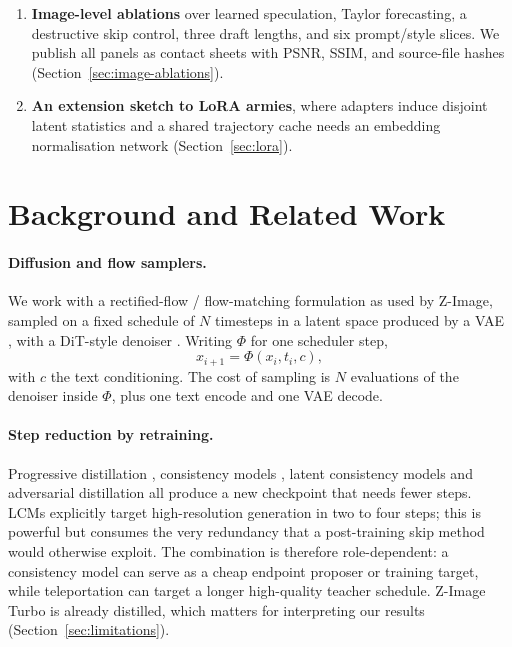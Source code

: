 \documentclass[11pt,a4paper]{article}
\begin{document}
\begin{enumerate}
    We distinguish pixel-exact serving results from approximate image retention and isolated kernel timing
    (Section~\ref{sec:native-ablation}).
  \item \textbf{Image-level ablations} over learned speculation, Taylor
    forecasting, a destructive skip control, three draft lengths, and six
    prompt/style slices. We publish all panels as contact sheets with PSNR,
    SSIM, and source-file hashes (Section~\ref{sec:image-ablations}).
  \item \textbf{An extension sketch to LoRA armies}, where adapters induce
    disjoint latent statistics and a shared trajectory cache needs an embedding
    normalisation network (Section~\ref{sec:lora}).
\end{enumerate}

\section{Background and Related Work}

\paragraph{Diffusion and flow samplers.}
We work with a rectified-flow / flow-matching formulation
\citep{liu2023rectified,lipman2023flow} as used by Z-Image, sampled on a fixed
schedule of $N$ timesteps in a latent space produced by a VAE
\citep{rombach2022ldm}, with a DiT-style denoiser \citep{peebles2023dit}.
Writing $\Phi$ for one scheduler step,
\begin{equation}
  x_{i+1} = \Phi(x_i, t_i, c),
\end{equation}
with $c$ the text conditioning. The cost of sampling is $N$ evaluations of the
denoiser inside $\Phi$, plus one text encode and one VAE decode.

\paragraph{Step reduction by retraining.}
Progressive distillation \citep{salimans2022progressive}, consistency models
\citep{song2023consistency}, latent consistency models \citep{luo2023lcm} and
adversarial distillation \citep{sauer2023adversarial} all produce a new
checkpoint that needs fewer steps. LCMs explicitly target high-resolution
generation in two to four steps; this is powerful but consumes the very
redundancy that a post-training skip method would otherwise exploit. The
combination is therefore role-dependent: a consistency model can serve as a
cheap endpoint proposer or training target, while teleportation can target a
longer high-quality teacher schedule. Z-Image Turbo is already distilled, which
matters for interpreting our results (Section~\ref{sec:limitations}).
\end{document}
